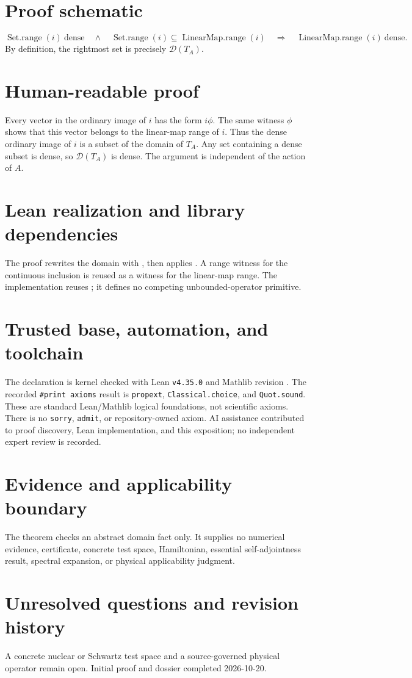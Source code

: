 \documentclass[11pt]{article}
\begin{document}
\section{Proof schematic}
\[
\operatorname{Set.range}(i)\ \text{dense}
\quad\land\quad
\operatorname{Set.range}(i)\subseteq\operatorname{LinearMap.range}(i)
\quad\Longrightarrow\quad
\operatorname{LinearMap.range}(i)\ \text{dense}.
\]
By definition, the rightmost set is precisely $\mathcal D(T_A)$.

\section{Human-readable proof}
Every vector in the ordinary image of $i$ has the form $i\phi$. The same witness $\phi$ shows that
this vector belongs to the linear-map range of $i$. Thus the dense ordinary image of $i$ is a subset
of the domain of $T_A$. Any set containing a dense subset is dense, so $\mathcal D(T_A)$ is dense.
The argument is independent of the action of $A$.

\section{Lean realization and library dependencies}
The proof rewrites the domain with , then applies
. A range witness for the continuous inclusion is reused as a
witness for the linear-map range. The implementation reuses
; it defines no competing unbounded-operator
primitive.

\section{Trusted base, automation, and toolchain}
The declaration is kernel checked with Lean \texttt{v4.35.0} and Mathlib revision
. The recorded \texttt{\#print axioms} result is
\texttt{propext}, \texttt{Classical.choice}, and \texttt{Quot.sound}. These are standard Lean/Mathlib
logical foundations, not scientific axioms. There is no \texttt{sorry}, \texttt{admit}, or
repository-owned axiom. AI assistance contributed to proof discovery, Lean implementation, and this
exposition; no independent expert review is recorded.

\section{Evidence and applicability boundary}
The theorem checks an abstract domain fact only. It supplies no numerical evidence, certificate,
concrete test space, Hamiltonian, essential self-adjointness result, spectral expansion, or physical
applicability judgment.

\section{Unresolved questions and revision history}
A concrete nuclear or Schwartz test space and a source-governed physical operator remain open.
Initial proof and dossier completed 2026-10-20.
\end{document}
